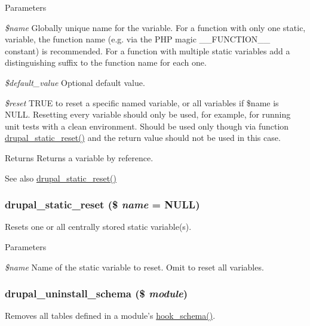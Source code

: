 \begin{DoxyParams}{Parameters}
\item[{\em \$name}]Globally unique name for the variable. For a function with only one static, variable, the function name (e.g. via the PHP magic \_\-\_\-FUNCTION\_\-\_\- constant) is recommended. For a function with multiple static variables add a distinguishing suffix to the function name for each one. \item[{\em \$default\_\-value}]Optional default value. \item[{\em \$reset}]TRUE to reset a specific named variable, or all variables if \$name is NULL. Resetting every variable should only be used, for example, for running unit tests with a clean environment. Should be used only though via function \hyperlink{group__schemaapi_ga714b5ed0b14c43b61eef0c895598c5c4}{drupal\_\-static\_\-reset()} and the return value should not be used in this case.\end{DoxyParams}
\begin{DoxyReturn}{Returns}
Returns a variable by reference.
\end{DoxyReturn}
\begin{DoxySeeAlso}{See also}
\hyperlink{group__schemaapi_ga714b5ed0b14c43b61eef0c895598c5c4}{drupal\_\-static\_\-reset()} 
\end{DoxySeeAlso}
\hypertarget{group__schemaapi_ga714b5ed0b14c43b61eef0c895598c5c4}{
\subsubsection[{drupal\_\-static\_\-reset}]{\setlength{\rightskip}{0pt plus 5cm}drupal\_\-static\_\-reset (\$ {\em name} = {\ttfamily NULL})}}
\label{group__schemaapi_ga714b5ed0b14c43b61eef0c895598c5c4}
Resets one or all centrally stored static variable(s).


\begin{DoxyParams}{Parameters}
\item[{\em \$name}]Name of the static variable to reset. Omit to reset all variables. \end{DoxyParams}
\hypertarget{group__schemaapi_ga0688b6627af9dc05f2618f81489c3db0}{
\subsubsection[{drupal\_\-uninstall\_\-schema}]{\setlength{\rightskip}{0pt plus 5cm}drupal\_\-uninstall\_\-schema (\$ {\em module})}}
\label{group__schemaapi_ga0688b6627af9dc05f2618f81489c3db0}
Removes all tables defined in a module's \hyperlink{group__schemaapi_ga9abd926ddaf68a22e6dca28a25d0c6f5}{hook\_\-schema()}.

